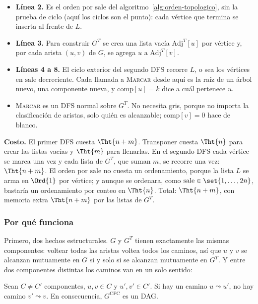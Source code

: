 \documentclass[11pt,letterpaper]{article}
\begin{document}
\begin{itemize}[itemsep=0.1em]
  \item \textbf{Línea 2.} Es el orden por $\text{sale}$ del
        algoritmo~\ref{alg:orden-topologico}, sin la prueba de ciclo
        (aquí los ciclos son el punto): cada vértice que termina se
        inserta al frente de $L$.
  \item \textbf{Línea 3.} Para construir $G^T$ se crea una lista
        vacía $\text{Adj}^T[u]$ por vértice y, por cada arista $(u, v)$
        de $G$, se agrega $u$ a $\text{Adj}^T[v]$.
  \item \textbf{Líneas 4 a 8.} El ciclo exterior del segundo DFS
        recorre $L$, o sea los vértices en $\text{sale}$ decreciente.
        Cada llamada a \textsc{Marcar} desde aquí es la raíz de un
        árbol nuevo, una componente nueva, y $\text{comp}[u] = k$ dice
        a cuál pertenece $u$.
  \item \textsc{Marcar} es un DFS normal sobre $G^T$. No necesita gris,
        porque no importa la clasificación de aristas, solo quién es
        alcanzable; $\text{comp}[v] = 0$ hace de blanco.
\end{itemize}

\textbf{Costo.} El primer DFS cuesta $\Tht{n + m}$. Transponer cuesta
$\Tht{n}$ para crear las listas vacías y $\Tht{m}$ para llenarlas. En
el segundo DFS cada vértice se marca una vez y cada lista de $G^T$, que
suman $m$, se recorre una vez: $\Tht{n + m}$. El orden por
$\text{sale}$ no cuesta un ordenamiento, porque la lista $L$ se arma en
$\Ord{1}$ por vértice; y aunque se ordenara, como
$\text{sale} \in \set{1, \dots, 2n}$, bastaría un ordenamiento por
conteo en $\Tht{n}$. Total: $\Tht{n + m}$, con memoria extra
$\Tht{n + m}$ por las listas de $G^T$.

\subsubsection*{Por qué funciona}

Primero, dos hechos estructurales. $G$ y $G^T$ tienen exactamente las
mismas componentes: voltear todas las aristas voltea todos los caminos,
así que $u$ y $v$ se alcanzan mutuamente en $G$ si y solo si se
alcanzan mutuamente en $G^T$. Y entre dos componentes distintas los
caminos van en un solo sentido:

\begin{lema}
  \label{lem:componentes-dag}
  Sean $C \neq C'$ componentes, $u, v \in C$ y $u', v' \in C'$. Si hay
  un camino $u \leadsto u'$, no hay camino $v' \leadsto v$. En
  consecuencia, $G^{\text{CFC}}$ es un DAG.
\end{lema}
\end{document}

